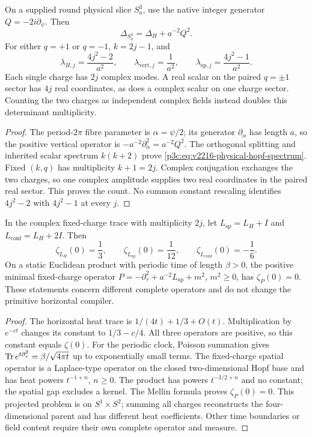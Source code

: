\documentclass[12pt,a4paper]{article}
\begin{document}
\begin{theorem}
\label{p3c:thm:v2216-round-hopf-completion}
On a supplied round physical slice $S^3_a$, use the native integer
generator $Q=-2i\partial_\psi$.  Then
\[
 \Delta_{S^3_a}=\Delta_H+a^{-2}Q^2.
\]
For either $q=+1$ or $q=-1$, $k=2j-1$, and
\begin{equation}
 \lambda_{H,j}=\frac{4j^2-2}{a^2},\qquad
 \lambda_{\mathrm{vert},j}=\frac1{a^2},\qquad
 \lambda_{\mathrm{sp},j}=\frac{4j^2-1}{a^2}.
 \label{p3c:eq:v2216-physical-hopf-spectrum}
\end{equation}
Each single charge has $2j$ complex modes.  A real scalar on the paired
$q=\pm1$ sector has $4j$ real coordinates, as does a complex scalar
on one charge sector.  Counting the two charges as independent complex
fields instead doubles this determinant multiplicity.
\end{theorem}
\begin{proof}
The period-$2\pi$ fibre parameter is $\alpha=\psi/2$; its generator
$\partial_\alpha$ has length $a$, so the positive vertical operator
is $-a^{-2}\partial_\alpha^2=a^{-2}Q^2$.  The orthogonal splitting
and inherited scalar spectrum $k(k+2)$ prove
\eqref{p3c:eq:v2216-physical-hopf-spectrum}.  Fixed $(k,q)$ has
multiplicity $k+1=2j$.  Complex conjugation exchanges the two charges,
so one complex amplitude supplies two real coordinates in the paired
real sector.  This proves the count.  No common constant rescaling
identifies $4j^2-2$ with $4j^2-1$ at every $j$.
\end{proof}

\begin{proposition}
\label{p3c:prop:v2216-completed-zeta}
In the complex fixed-charge trace with multiplicity $2j$, let
$L_{\mathrm{sp}}=L_H+I$ and $L_{\mathrm{conf}}=L_H+2I$.  Then
\[
 \zeta_{L_H}(0)=\frac13,\qquad
 \zeta_{L_{\mathrm{sp}}}(0)=\frac1{12},\qquad
 \zeta_{L_{\mathrm{conf}}}(0)=-\frac16.
\]
On a static Euclidean product with periodic time of length $\beta>0$,
the positive minimal fixed-charge operator
$P=-\partial_\tau^2+a^{-2}L_{\mathrm{sp}}+m^2$, $m^2\ge0$,
has $\zeta_P(0)=0$.  These statements concern different complete
operators and do not change the primitive horizontal compiler.
\end{proposition}
\begin{proof}
The horizontal heat trace is $1/(4t)+1/3+O(t)$.
Multiplication by $e^{-ct}$ changes its constant to $1/3-c/4$.
All three operators are positive, so this constant equals $\zeta(0)$.
For the periodic clock, Poisson summation gives
$\operatorname{Tr} e^{t\partial_\tau^2}=\beta/\sqrt{4\pi t}$ up to exponentially
small terms.  The fixed-charge spatial operator is a Laplace-type
operator on the closed two-dimensional Hopf base and has heat powers
$t^{-1+n}$, $n\ge0$.  The product has powers $t^{-3/2+n}$ and no
constant; the spatial gap excludes a kernel.  The Mellin formula proves
$\zeta_P(0)=0$.  This projected problem is on $S^1\times S^2$;
summing all charges reconstructs the four-dimensional parent and has
different heat coefficients.  Other time boundaries or field content
require their own complete operator and measure.
\end{proof}
\end{document}
